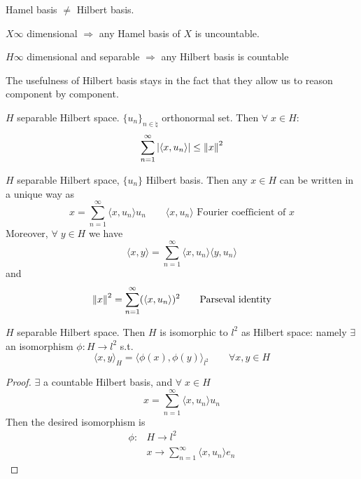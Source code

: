 \begin{remark}
    Hamel basis \(\neq\) Hilbert basis.

    \(X \infty\) dimensional \(\Rightarrow\) any Hamel basis of \(X\) is uncountable.

    \(H \infty\) dimensional and separable \(\Rightarrow\) any Hilbert basis is countable
\end{remark}

The usefulness of Hilbert basis stays in the fact that they allow us to reason component by component.

\begin{theorem}
    \(H\) separable Hilbert space. \(\{u_n\}_{n \in \natural}\) orthonormal set. Then \(\forall \; x \in H\):
    \[
        \sum_{n=1}^\infty \abs{\langle x, u_n\rangle  } \leq \norm{x}^2
    \]
\end{theorem}
\begin{theorem}
    \(H\) separable Hilbert space, \(\{u_n\}\) Hilbert basis.
    Then any \(x \in H\) can be written in a unique way as 
    \[
        x = \sum_{n=1}^\infty \langle x, u_n\rangle   u_n \qquad \langle x, u_n\rangle   \text{ Fourier coefficient of }x
    \]
    Moreover, \(\forall\; y \in H\) we have
    \[
        \langle x, y\rangle   = \sum_{n=1}^\infty \langle x, u_n\rangle   \langle y, u_n \rangle  
    \]
    and 
    \[
        \norm{x}^2 = \sum_{n=1}^\infty (\langle x, u_n\rangle  )^2 \tag*{Parseval identity}
    \]
\end{theorem}
\begin{theorem}
    \(H\) separable Hilbert space. Then \(H\) is isomorphic to \(l^2\) as Hilbert space: namely \(\exists\) an isomorphism \(\phi: H \to l^2\) s.t.
    \[
        \langle x, y\rangle  _H = \langle \phi(x), \phi(y)\rangle  _{l^2} \qquad \forall x, y \in H
    \]
\end{theorem}
\begin{proof}
    \(\exists\) a countable Hilbert basis, and \(\forall\; x \in H\)
    \[
        x = \sum_{n=1}^\infty \langle x, u_n\rangle   u_n
    \]
    Then the desired isomorphism is
    \[
        \begin{array}{rl}
            \phi: & H \to l^2 \\
            & x \to \sum_{n=1}^\infty \langle x, u_n\rangle   e_n
        \end{array}
    \]
\end{proof}

